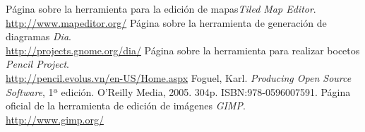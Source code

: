 \documentclass[a4paper,11pt]{article} %
\begin{document}
\begin{thebibliography}{99}
Página sobre la herramienta para la edición de mapas\emph{Tiled Map Editor}.\\ \url{http://www.mapeditor.org/}
Página sobre la herramienta de generación de diagramas \emph{Dia}.\\ \url{http://projects.gnome.org/dia/}
Página sobre la herramienta para realizar bocetos \emph{Pencil Project}.\\ \url{http://pencil.evolus.vn/en-US/Home.aspx}
Foguel, Karl. \emph{Producing Open Source Software}, 1ª edición. O'Reilly Media, 2005. 304p. ISBN:978-0596007591.
Página oficial de la herramienta de edición de imágenes \emph{GIMP}.\\ \url{http://www.gimp.org/}
\end{thebibliography}
\end{document}
